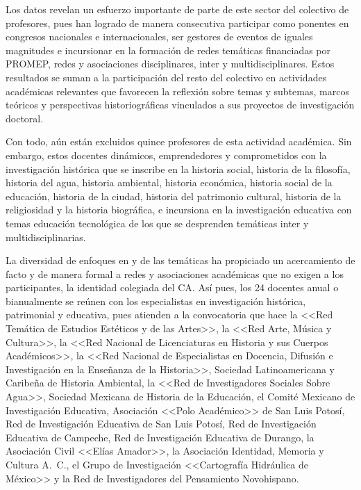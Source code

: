 Los datos revelan un esfuerzo importante de parte de este sector del
colectivo de profesores, pues han  logrado de manera consecutiva participar
como ponentes en congresos nacionales e internacionales, ser gestores de
eventos de iguales magnitudes e incursionar en la formación de redes
temáticas financiadas por PROMEP, redes y asociaciones  disciplinares,
inter y multidisciplinares. Estos  resultados se suman a la participación
del resto del colectivo en actividades académicas relevantes que favorecen
la reflexión sobre temas y subtemas, marcos teóricos y perspectivas
historiográficas vinculados a sus proyectos de investigación doctoral. 


Con  todo, aún están excluidos quince profesores de esta actividad
académica. Sin embargo, estos docentes dinámicos, emprendedores y
comprometidos con la investigación histórica que se inscribe en la historia
social, historia de la filosofía, historia  del agua, historia ambiental,
historia económica, historia social de la educación, historia de la ciudad,
historia del patrimonio cultural, historia de la religiosidad y la historia
biográfica, e incursiona en la investigación educativa con temas educación
tecnológica de los que se desprenden temáticas inter y multidisciplinarias.
\enlargethispage{1\baselineskip}
 
La diversidad de enfoques en y de las temáticas ha propiciado un
acercamiento de facto y de manera formal a redes y asociaciones académicas
que no exigen a los participantes, la identidad colegiada del CA. Así pues,
los 24 docentes anual o bianualmente se reúnen con los especialistas en
investigación histórica, patrimonial y educativa, pues atienden a la
convocatoria que hace  la <<Red Temática de Estudios Estéticos y de las
Artes>>, la <<Red Arte, Música y Cultura>>, la <<Red Nacional de Licenciaturas
en Historia y sus Cuerpos Académicos>>, la <<Red Nacional de Especialistas en
Docencia, Difusión e Investigación en la Enseñanza de la Historia>>,
Sociedad Latinoamericana y Caribeña de Historia Ambiental, la <<Red de
Investigadores Sociales Sobre Agua>>, Sociedad Mexicana de Historia de la
Educación, el Comité Mexicano de Investigación Educativa, Asociación <<Polo
Académico>> de San Luis Potosí, Red de Investigación  Educativa de San Luis
Potosí, Red de Investigación Educativa de Campeche, Red de Investigación
Educativa de Durango,  la Asociación Civil <<Elías Amador>>, la Asociación
Identidad, Memoria y Cultura A.\ C., el Grupo de Investigación <<Cartografía
Hidráulica de México>> y la Red de Investigadores del Pensamiento
Novohispano.

